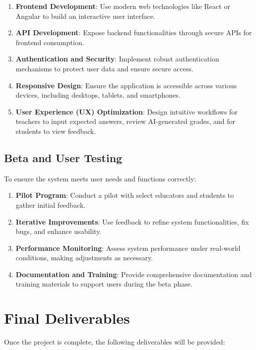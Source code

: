 \documentclass[ms,twoside,print]{nuthesis}
\begin{document}
\begin{enumerate}
    \item \textbf{Frontend Development}: Use modern web technologies like React or Angular to build an interactive user interface.
    \item \textbf{API Development}: Expose backend functionalities through secure APIs for frontend consumption.
    \item \textbf{Authentication and Security}: Implement robust authentication mechanisms to protect user data and ensure secure access.
    \item \textbf{Responsive Design}: Ensure the application is accessible across various devices, including desktops, tablets, and smartphones.
    \item \textbf{User Experience (UX) Optimization}: Design intuitive workflows for teachers to input expected answers, review AI-generated grades, and for students to view feedback.
\end{enumerate}

\subsection{Beta and User Testing}

To ensure the system meets user needs and functions correctly:

\begin{enumerate}
    \item \textbf{Pilot Program}: Conduct a pilot with select educators and students to gather initial feedback.
    \item \textbf{Iterative Improvements}: Use feedback to refine system functionalities, fix bugs, and enhance usability.
    \item \textbf{Performance Monitoring}: Assess system performance under real-world conditions, making adjustments as necessary.
    \item \textbf{Documentation and Training}: Provide comprehensive documentation and training materials to support users during the beta phase.
\end{enumerate}

\section{Final Deliverables}

Once the project is complete, the following deliverables will be provided:
\end{document}
